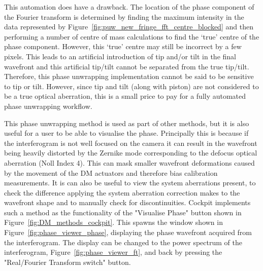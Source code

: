 This automation does have a drawback. The location of the phase component of the Fourier transform is determined by finding the maximum intensity in the data represented by Figure~\ref{fig:puw_new_fringe_fft_centre_blocked} and then performing a number of centre of mass calculations to find the `true' centre of the phase component. However, this `true' centre may still be incorrect by a few pixels. This leads to an artificial introduction of tip and/or tilt in the final wavefront and this artificial tip/tilt cannot be separated from the true tip/tilt. Therefore, this phase unwrapping implementation cannot be said to be sensitive to tip or tilt. However, since tip and tilt (along with piston) are not considered to be a true optical aberration, this is a small price to pay for a fully automated phase unwrapping workflow.

This phase unwrapping method is used as part of other methods, but it is also useful for a user to be able to visualise the phase. Principally this is because if the interferogram is not well focused on the camera it can result in the wavefront being heavily distorted by the Zernike mode corresponding to the defocus optical aberration (Noll Index 4). This can mask smaller wavefront deformations caused by the movement of the DM actuators and therefore bias calibration measurements. It is can also be useful to view the system aberrations present, to check the difference applying the system aberration correction makes to the wavefront shape and to manually check for discontinuities. Cockpit implements such a method as the functionality of the "Visualise Phase" button shown in Figure~\ref{fig:DM_methods_cockpit}. This spawns the window shown in Figure~\ref{fig:phase_viewer_phase}, displaying the phase wavefront acquired from the interferogram. The display can be changed to the power spectrum of the interferogram, Figure~\ref{fig:phase_viewer_ft}, and back by pressing the "Real/Fourier Transform switch" button. 

